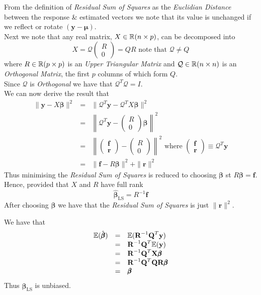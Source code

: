 \documentclass[11pt,a4paper]{article}
\begin{document}
From the definition of \textit{Residual Sum of Squares} as the \textit{Euclidian Distance} between the response \& estimated vectors we note that its value is unchanged if we reflect or rotate $(\textbf{y}-\pmb\mu)$.\\
Next we note that any real matrix, $X\in\mathbb{R}(n\times p)$, can be decomposed into
$$X=\mathcal{Q}\begin{pmatrix}R\\0\end{pmatrix}=QR\text{ note that }\mathcal{Q}\neq Q$$
where $R\in\mathbb{R}(p\times p)$ is an \textit{Upper Triangular Matrix} and $\mathcal{Q}\in\mathbb{R}(n\times n)$ is an \textit{Orthogonal Matrix}, the first $p$ columns of which form $Q$.\\
Since $\mathcal{Q}$ is \textit{Orthogonal} we have that $\mathcal{Q}^T\mathcal{Q}=I$.\\
We can now derive the result that
\[\begin{array}{rcl}
\|\textbf{y}-X\pmb\beta\|^2&=&\|\mathcal{Q}^T\textbf{y}-\mathcal{Q}^TX\pmb\beta\|^2\\
&=&\left\|\mathcal{Q}^T\textbf{y}-\begin{pmatrix}R\\0\end{pmatrix}\pmb\beta\right\|^2\\
&=&\left\|\begin{pmatrix}\textbf{f}\\\textbf{r}\end{pmatrix}-\begin{pmatrix}R\\0\end{pmatrix}\right\|^2\text{ where }\begin{pmatrix}\textbf{f}\\\textbf{r}\end{pmatrix}\equiv\mathcal{Q}^T\textbf{y}\\
&=&\|\textbf{f}-R\pmb\beta\|^2+\|\textbf{r}\|^2
\end{array}\]
Thus minimising the \textit{Residual Sum of Squares} is reduced to choosing $\pmb\beta$ st $R\pmb\beta=\textbf{f}$.\\
Hence, provided that $X$ and $R$ have full rank
$$\hat{\pmb\beta}_\text{LS}=R^{-1}\textbf{f}$$
\nb After choosing $\pmb\beta$ we have that the \textit{Residual Sum of Squares} is just $\|\textbf{r}\|^2$.

We have that
\[\begin{array}{rcl}
\mathbb{E}(\hat{\pmb\beta})&=&\mathbb{E}(\textbf{R}^{-1}\textbf{Q}^T\textbf{y})\\
&=&\textbf{R}^{-1}\textbf{Q}^T\mathbb{E}(\textbf{y})\\
&=&\textbf{R}^{-1}\textbf{Q}^T\textbf{X}\pmb\beta\\
&=&\textbf{R}^{-1}\textbf{Q}^T\textbf{Q}\textbf{R}\pmb\beta\\
&=&\pmb\beta
\end{array}\]
Thus $\hat{\pmb\beta}_\text{LS}$ is unbiased.\\
\end{document}
